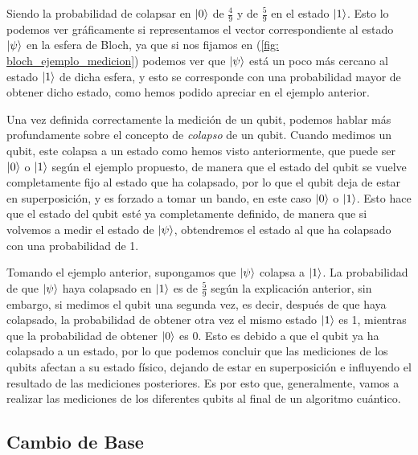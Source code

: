 \documentclass{article}
\numberwithin{equation}{section} %
\begin{document}
    Siendo la probabilidad de colapsar en \( \ket{0} \) de \( \frac{4}{9} \) y de \( \frac{5}{9} \) en el estado \( \ket{1} \). Esto lo podemos ver gráficamente si representamos el vector correspondiente al estado \( \ket{\psi} \) en la esfera de Bloch, ya que si nos fijamos en (\ref{fig: bloch_ejemplo_medicion}) podemos ver que \( \ket{\psi} \) está un poco más cercano al estado \( \ket{1} \) de dicha esfera, y esto se corresponde con una probabilidad mayor de obtener dicho estado, como hemos podido apreciar en el ejemplo anterior.

    \vspace{5mm}

    Una vez definida correctamente la medición de un qubit, podemos hablar más profundamente sobre el concepto de \textit{colapso} de un qubit. Cuando medimos un qubit, este colapsa a un estado como hemos visto anteriormente, que puede ser \( \ket{0} \) o \( \ket{1} \) según el ejemplo propuesto, de manera que el estado del qubit se vuelve completamente fijo al estado que ha colapsado, por lo que el qubit deja de estar en superposición, y es forzado a tomar un bando, en este caso \( \ket{0} \) o \( \ket{1} \). Esto hace que el estado del qubit esté ya completamente definido, de manera que si volvemos a medir el estado de \( \ket{\psi} \), obtendremos el estado al que ha colapsado con una probabilidad de 1.

    \vspace{5mm}

    Tomando el ejemplo anterior, supongamos que \( \ket{\psi} \) colapsa a \( \ket{1} \). La probabilidad de que \( \ket{\psi} \) haya colapsado en \( \ket{1} \) es de \( \frac{5}{9} \) según la explicación anterior, sin embargo, si medimos el qubit una segunda vez, es decir, después de que haya colapsado, la probabilidad de obtener otra vez el mismo estado \( \ket{1} \) es 1, mientras que la probabilidad de obtener \( \ket{0} \) es 0. Esto es debido a que el qubit ya ha colapsado a un estado, por lo que podemos concluir que las mediciones de los qubits afectan a su estado físico, dejando de estar en superposición e influyendo el resultado de las mediciones posteriores. Es por esto que, generalmente, vamos a realizar las mediciones de los diferentes qubits al final de un algoritmo cuántico.

    \vspace{10mm}





    \subsection{Cambio de Base}
\end{document}
